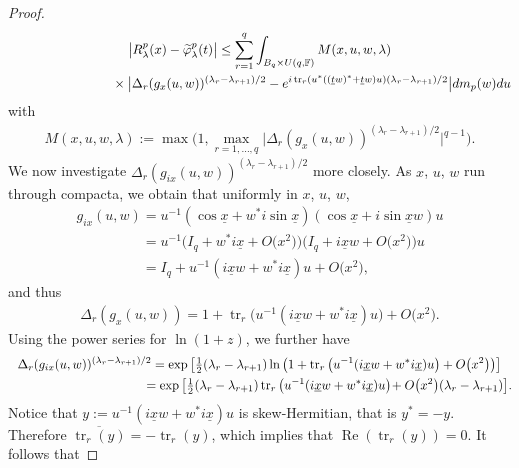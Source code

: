 \documentclass[11pt]{article}
\numberwithin{equation}{section}
\DeclareMathOperator{\Ree}{Re}
\begin{document}
\begin{proof}
\begin{gather}
\big|R_{\lambda}^p(x)-\widetilde\varphi_\lambda^{p}(t)\big| \leq \sum\limits_{r=1}^q \int_{B_q\times U(q,\mathbb F)}
M(x,u,w,\lambda)
\label{main-estimate}
\\
\hphantom{\big|R_{\lambda}^p(x)-\widetilde\varphi_\lambda^{p}(t)\big| \leq}{}
\times \big| \Delta_r(g_{x}(u,w))^{(\lambda_r-\lambda_{r+1})/2}
 - e^{i \operatorname{tr}_r(u^*((\underline tw)^*+ \underline tw)u)  (\lambda_r-\lambda_{r+1})/2}\big| dm_p(w)du
\nonumber
\end{gather}
with
\begin{gather*}
M(x,u,w,\lambda):=\max \Big(1, \max_{r=1,\ldots,q}\big|\Delta_r(g_{x}(u,w))^{(\lambda_r-\lambda_{r+1})/2}\big|^{q-1}\Big).
\end{gather*}
We now investigate $\Delta_r(g_{ix}(u,w))^{(\lambda_r-\lambda_{r+1})/2}$ more closely.
As $x$, $u$, $w$ run through compacta, we obtain that uniformly in $x$, $u$, $w$,
\begin{gather*}
g_{ix}(u,w)=u^{-1}(\cos\underline x+w^*i \sin \underline x)(\cos\underline x+i\sin \underline x w)u
\\
\phantom{g_{ix}(u,w)}
=u^{-1}\big(I_q+ w^*i\underline x+O\big(x^2\big)\big) \big(I_q+i \underline x w+O\big(x^2\big)\big)u
\\
\phantom{g_{ix}(u,w)}
=I_q+ u^{-1}(i\underline x w+w^*i\underline x)u +O\big(x^2\big),
\end{gather*}
and thus
\begin{gather}
\label{entwickel}
\Delta_r(g_{x}(u,w))= 1+ \operatorname{tr}_r\big(u^{-1}(i\underline xw+w^*i\underline x)u\big)+O\big(x^2\big).
\end{gather}
Using the power series for $\ln(1+z)$, we further have
\begin{gather*}
\Delta_r(g_{ix}(u,w) )^{(\lambda_r-\lambda_{r+1})/2}=\exp\big[\tfrac 12 (\lambda_r-\lambda_{r+1})  \ln\big(1+
\operatorname{tr}_r\big(u^{-1}(i\underline xw+w^*i\underline x)u\big) +O\big(x^2\big)\big)\big]
\\
\hphantom{\Delta_r(g_{ix}(u,w) )^{(\lambda_r-\lambda_{r+1})/2}}{}
 =\exp\big[\tfrac 12(\lambda_r-\lambda_{r+1})  \operatorname{tr}_r\big(u^{-1}(i\underline xw+w^*i\underline x)u\big)\!+O\big(x^2\big) (\lambda_r-\lambda_{r+1})\big].\!
\end{gather*}
Notice that $y:= u^{-1}(i\underline xw+w^*i\underline x)u $ is skew-Hermitian, that is $y^*=-y$.
Therefore $\overline {\operatorname{tr}_r(y)}=- \operatorname{tr}_r(y)$, which implies that $\Ree(\operatorname{tr}_r(y))=0$. It follows that

\end{proof}
\end{document}

